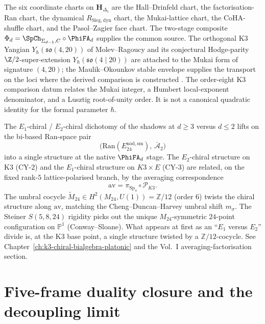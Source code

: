 \begin{remark}
\label{rem:v3-intro-seven-parts-six-charts}
The six coordinate charts on $\mathbf H_{\Delta_5}$ are the
Hall--Drinfeld chart, the factorisation-Ran chart, the dynamical
$R_{\mathrm{Sieg,dyn}}$ chart, the Mukai-lattice chart, the CoHA-shuffle
chart, and the Pasol--Zagier face chart. The two-stage composite
$\Phi_d = \SpCh_{\Sigma_{d-1}, C}\circ\PhiFA_d$ supplies the common
source. The orthogonal K$3$ Yangian
$Y_\hbar(\mathfrak{so}(4, 20))$ of Molev--Ragoucy and its conjectural
Hodge-parity $\Z/2$-super-extension
$Y_\hbar(\mathfrak{so}(4 \mid 20))$ are attached to the Mukai form of
signature $(4,20)$; the Maulik--Okounkov stable envelope supplies the
transport on the loci where the derived comparison is constructed
\cite{PasolZagier2013,Drinfeld1990,EtingofKazhdan2007PartV,ChengDuncanHarvey2014}.
The order-eight K3 comparison datum relates the Mukai integer, a
Humbert local-exponent denominator, and a Lusztig root-of-unity order.
It is not a canonical quadratic identity for the formal parameter
\(\hbar\).
\end{remark}

\begin{remark}
\label{rem:v3-intro-bibased-ran}
The $E_1$-chiral / $E_2$-chiral dichotomy of the shadows at
$d \geq 3$ versus $d \leq 2$ lifts on the bi-based Ran-space
pair
\[
 \bigl(\mathrm{Ran}(E^{\mathrm{nod,sm}}_{24}),\,\bar{\mathcal A}_2\bigr)
\]
into a single structure at the native $\PhiFA_d$ stage. The $E_2$-chiral structure on K3 (CY-$2$) and
the $E_1$-chiral structure on $K3\times E$ (CY-$3$) are related, on the fixed rank-\(5\) lattice-polarised branch, by the averaging correspondence
\[
 \mathrm{av}=\pi_{\mathrm{Sp}_4}\circ\mathscr P_{K3}.
\]
The umbral cocycle
$\widetilde M_{24}\in H^2(M_{24},U(1)) = \mathbb Z/12$ (order $6$) twists
the chiral structure along $\mathrm{av}$, matching the
Cheng--Duncan--Harvey umbral shift $m_\sigma$. The Steiner $S(5,8,24)$
rigidity picks out the unique $M_{24}$-symmetric $24$-point configuration
on $\mathbb P^1$ (Conway--Sloane). What appears at first as an ``$E_1$
versus $E_2$'' divide is, at the K3 base point, a single structure
twisted by a $\mathbb Z/12$-cocycle. See Chapter~\ref{ch:k3-chiral-bialgebra-platonic}
and the Vol.~I averaging-factorisation section.
\end{remark}

\section{Five-frame duality closure and the decoupling limit}
\label{sec:v3-intro-five-frame-closure}

